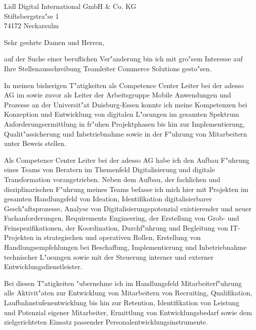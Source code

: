 \documentclass[10pt,a4paper]{dinbrief}
\date{\today}
\begin{document}
 
\begin{letter}  
{%
	Lidl Digital International GmbH \& Co. KG\\
	Stiftsbergstra"se 1\\
	74172 Neckarsulm
}
\subject{\bf Teamleiter Commerce Solutions}
\opening{Sehr geehrte Damen und Herren,}
auf der Suche einer beruflichen Ver"anderung bin ich mit gro"sem Interesse auf Ihre Stellenausschreibung Teamleiter Commerce Solutions  gesto"sen. 

In meinen bisherigen T"atigkeiten als Competence Center Leiter bei der adesso AG im sowie zuvor als Leiter der Arbeitsgruppe Mobile Anwendungen und  Prozesse an der Universit"at Duisburg-Essen konnte ich meine Kompetenzen bei Konzeption und Entwicklung von digitalen L"osungen im gesamten Spektrum Anforderungsermittlung in fr"uhen Projektphasen bis hin zur Implementierung, Qualit"assicherung und Inbetriebnahme sowie in der F"uhrung von Mitarbeitern unter Beweis stellen.


Als Competence Center Leiter bei der adesso AG habe ich den Aufbau F"uhrung eines Teams von Beratern im Themenfeld Digitalisierung und digitale Transformation vorangetrieben. Neben dem Aufbau, der fachlichen und disziplinarischen F"uhrung meines Teams befasse ich mich hier mit Projekten im gesamten Handlungsfeld von Ideation, Identifikation digitalisierbarer Gesch"aftsprozesse, Analyse von Digitalisierungspotenzial existierender und neuer Fachanforderungen, Requirements Engineering, der Erstellung von Grob- und Feinspezifikationen, der Koordination, Durchf"uhrung und Begleitung von IT-Projekten in strategischen und operativen Rollen, Erstellung von Handlungsempfehlungen bei Beschaffung, Implementierung und Inbetriebnahme technischer L"osungen sowie mit der Steuerung interner und externer Entwicklungsdienstleister. 

Bei diesen T"atigkeiten "ubernehme ich im Handlungsfeld Mitarbeiterf"uhrung alle Aktivit"aten zur Entwicklung von Mitarbeitern von Recruiting, Qualifikation, Laufbahnstufenentwicklung bis hin zur Retention, Identifikation von Leistung und Potenzial eigener Mitarbeiter, Ermittlung von Entwicklungsbedarf sowie dem zielgerichteten Einsatz passender Personalentwicklungsinstrumente.


\end{letter}
\end{document}
